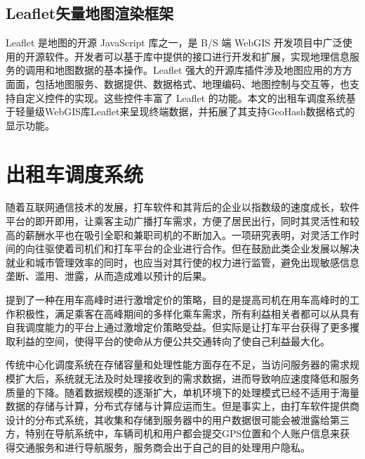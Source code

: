 \subsection{Leaflet矢量地图渲染框架}
Leaflet 是地图的开源 JavaScript 库之一，是 B/S 端 WebGIS 开发项目中广泛使用的开源软件。开发者可以基于库中提供的接口进行开发和扩展，实现地理信息服务的调用和地图数据的基本操作。Leaflet 强大的开源库插件涉及地图应用的方方面面，包括地图服务、数据提供、数据格式、地理编码、地图控制与交互等，也支持自定义控件的实现。这些控件丰富了 Leaflet  的功能。本文的出租车调度系统基于轻量级WebGIS库Leaflet来呈现终端数据，并拓展了其支持GeoHash数据格式的显示功能。

\section{出租车调度系统}
随着互联网通信技术的发展，打车软件和其背后的企业以指数级的速度成长，软件平台的即开即用，让乘客主动广播打车需求，方便了居民出行，同时其灵活性和较高的薪酬水平也在吸引全职和兼职司机的不断加入。一项研究表明，对灵活工作时间的向往驱使着司机们和打车平台的企业进行合作。但在鼓励此类企业发展以解决就业和城市管理效率的同时，也应当对其行使的权力进行监管，避免出现敏感信息垄断、滥用、泄露，从而造成难以预计的后果。\par

提到了一种在用车高峰时进行激增定价的策略，目的是提高司机在用车高峰时的工作积极性，满足乘客在高峰期间的多样化乘车需求，所有利益相关者都可以从具有自我调度能力的平台上通过激增定价策略受益。但实际是让打车平台获得了更多攫取利益的空间，使得平台的使命从方便公共交通转向了使自己利益最大化。\par

传统中心化调度系统在存储容量和处理性能方面存在不足，当访问服务器的需求规模扩大后，系统就无法及时处理接收到的需求数据，进而导致响应速度降低和服务质量的下降。随着数据规模的逐渐扩大，单机环境下的处理模式已经不适用于海量数据的存储与计算，分布式存储与计算应运而生。但是事实上，由打车软件提供商设计的分布式系统，其收集和存储到服务器中的用户数据很可能会被泄露给第三方，特别在导航系统中，车辆司机和用户都会提交GPS位置和个人账户信息来获得交通服务和进行导航服务，服务商会出于自己的目的处理用户隐私。\par

